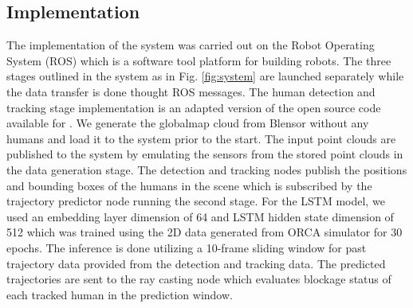 \documentclass[conference]{IEEEtran}
\begin{document}
\subsection{Implementation}

The implementation of the system was carried out on the Robot Operating System (ROS) which is a software tool platform for building robots. %
The three stages  outlined in the system as in Fig. \ref{fig:system} are launched separately while the data transfer is done thought ROS messages. The human  detection and tracking stage implementation is an adapted version of the open source code available for \cite{koide}. We generate the globalmap cloud from Blensor without any humans and load it to the system prior to the start. The input point clouds are published to the system by emulating the sensors from the stored point clouds in the data generation stage. %
The detection and tracking nodes publish the positions and bounding boxes of the humans in the scene which is subscribed by the trajectory predictor node running the second stage. For the LSTM model, we used an embedding layer dimension of 64 and LSTM  hidden state dimension of 512 which was trained using the 2D data generated from ORCA simulator for 30 epochs. %
The inference is done utilizing a 10-frame sliding window for past trajectory data provided from the detection and tracking data. The predicted trajectories are sent to the ray casting node which evaluates blockage status of each tracked human in the prediction window.

\end{document}
